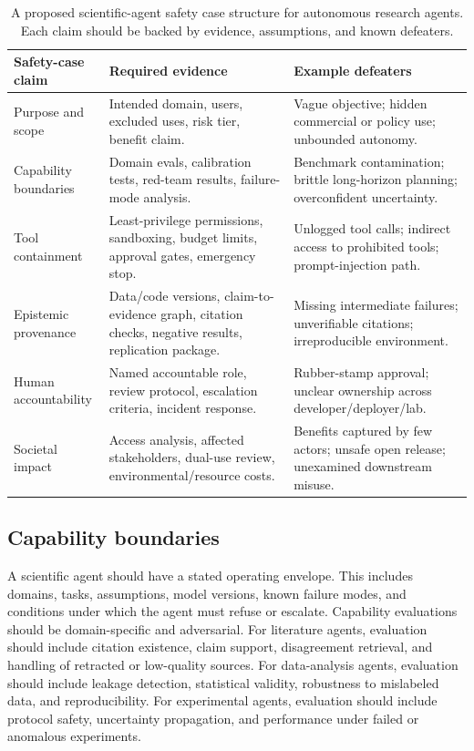 \documentclass{article}
\newcommand{\safetycase}{scientific-agent safety case}
\begin{document}
\begin{table}[t]
\centering
\small
\setlength{\tabcolsep}{4pt}
\renewcommand{\arraystretch}{1.3}
\caption{A proposed \safetycase{} structure for autonomous research agents. Each claim should be backed by evidence, assumptions, and known defeaters.}
\label{tab:safetycase}
\begin{tabularx}{\textwidth}{@{}>{\raggedright\arraybackslash}p{}>{\raggedright\arraybackslash}p{}>{\raggedright\arraybackslash}X@{}}
\toprule
Safety-case claim & Required evidence & Example defeaters \\
\midrule
Purpose and scope & Intended domain, users, excluded uses, risk tier, benefit claim. & Vague objective; hidden commercial or policy use; unbounded autonomy. \\
Capability boundaries & Domain evals, calibration tests, red-team results, failure-mode analysis. & Benchmark contamination; brittle long-horizon planning; overconfident uncertainty. \\
Tool containment & Least-privilege permissions, sandboxing, budget limits, approval gates, emergency stop. & Unlogged tool calls; indirect access to prohibited tools; prompt-injection path. \\
Epistemic provenance & Data/code versions, claim-to-evidence graph, citation checks, negative results, replication package. & Missing intermediate failures; unverifiable citations; irreproducible environment. \\
Human accountability & Named accountable role, review protocol, escalation criteria, incident response. & Rubber-stamp approval; unclear ownership across developer/deployer/lab. \\
Societal impact & Access analysis, affected stakeholders, dual-use review, environmental/resource costs. & Benefits captured by few actors; unsafe open release; unexamined downstream misuse. \\
\bottomrule
\end{tabularx}
\end{table}

\subsection{Capability boundaries}

A scientific agent should have a stated operating envelope. This includes domains, tasks, assumptions, model versions, known failure modes, and conditions under which the agent must refuse or escalate. Capability evaluations should be domain-specific and adversarial. For literature agents, evaluation should include citation existence, claim support, disagreement retrieval, and handling of retracted or low-quality sources. For data-analysis agents, evaluation should include leakage detection, statistical validity, robustness to mislabeled data, and reproducibility. For experimental agents, evaluation should include protocol safety, uncertainty propagation, and performance under failed or anomalous experiments.
\end{document}
